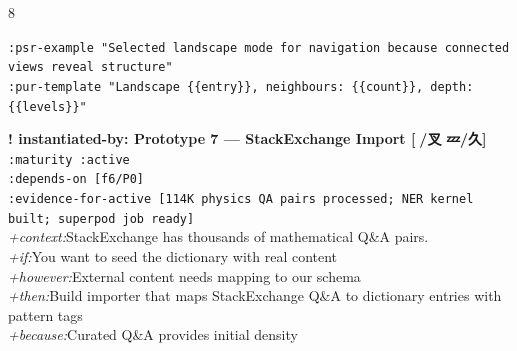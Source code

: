 \documentclass[landscape]{article}
\newcommand{\flexitag}[1]{\textcolor[gray]{0.35}{\textit{#1}}}
\newenvironment{devmapactive}{%
  \def\FrameCommand{\colorbox{devmapactivebg}}%
  \setlength{\fboxsep}{2pt}%
  \MakeFramed{\advance\hsize-\width \FrameRestore}%
}{\endMakeFramed}
\newenvironment{devmapgreenfield}{%
  \def\FrameCommand{\colorbox{devmapgreenfieldbg}}%
  \setlength{\fboxsep}{2pt}%
  \MakeFramed{\advance\hsize-\width \FrameRestore}%
}{\endMakeFramed}
\begin{document}
\begin{paracol}{8}
\begin{devmapgreenfield}
\par
  \texttt{:\allowbreak{}psr-\allowbreak{}example "Selected landscape mode for navigation because connected views reveal structure"}\\
  \texttt{:\allowbreak{}pur-\allowbreak{}template "Landscape \{\{entry\}\},\allowbreak{} neighbours:\allowbreak{} \{\{count\}\},\allowbreak{} depth:\allowbreak{} \{\{levels\}\}"}\\
\par
\par
\end{devmapgreenfield}
\begin{devmapactive}
\textbf{! instantiated-by: Prototype 7 — StackExchange Import [🙅/叉 💤/久]}\\
  \texttt{:\allowbreak{}maturity :\allowbreak{}active}\\
  \texttt{:\allowbreak{}depends-\allowbreak{}on [f6/\allowbreak{}P0]}\\
  \texttt{:\allowbreak{}evidence-\allowbreak{}for-\allowbreak{}active [114K physics QA pairs processed;\allowbreak{} NER kernel built;\allowbreak{} superpod job ready]}\\
  \flexitag{+context:}StackExchange has thousands of mathematical Q\&A pairs.\\
  \flexitag{+if:}You want to seed the dictionary with real content\\
  \flexitag{+however:}External content needs mapping to our schema\\
  \flexitag{+then:}Build importer that maps StackExchange Q\&A to dictionary entries with pattern tags\\
  \flexitag{+because:}Curated Q\&A provides initial density\\

\end{devmapactive}
\end{paracol}
\end{document}
